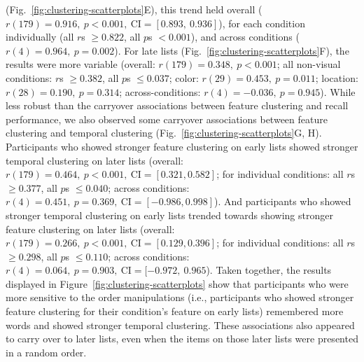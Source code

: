 \documentclass[11pt]{article}
\begin{document}
(Fig.~\ref{fig:clustering-scatterplots}E), this trend held overall ($r(179) =
0.916,~p < 0.001,~\mathrm{CI} = [0.893,~0.936]$), for each condition
individually (all $r$s $\geq 0.822$, all $p$s $< 0.001$), and across conditions
($r(4) = 0.964,~p = 0.002$). For late lists
(Fig.~\ref{fig:clustering-scatterplots}F), the results were more variable
(overall: $r(179) = 0.348,~p < 0.001$; all non-visual conditions: $r$s $\geq
0.382$, all $p$s $\leq 0.037$; color: $r(29) = 0.453,~p = 0.011$; location: $
r(28) = 0.190,~p = 0.314$; across-conditions: $r(4) = -0.036,~p = 0.945$).
While less robust than the carryover associations between feature clustering
and recall performance, we also observed some carryover associations between
feature clustering and temporal clustering
(Fig.~\ref{fig:clustering-scatterplots}G, H). Participants who showed stronger
feature clustering on early lists showed stronger temporal clustering on later
lists (overall: $r(179) = 0.464,~p < 0.001,~\mathrm{CI} = [0.321, 0.582]$; for
individual conditions: all $r$s $\geq 0.377$, all $p$s $\leq 0.040$; across
conditions: $ r(4) = 0.451,~p = 0.369,~\mathrm{CI} = [-0.986, 0.998]$). And
participants who showed stronger temporal clustering on early lists trended
towards showing stronger feature clustering on later lists (overall: $r(179) =
0.266,~p < 0.001,~\mathrm{CI} = [0.129, 0.396]$; for individual conditions: all
$r$s $\geq 0.298$, all $p$s $\leq 0.110$; across conditions: $r(4) = 0.064,~p =
0.903,~\mathrm{CI} = [-0.972,~0.965$). Taken together, the results displayed in
Figure~\ref{fig:clustering-scatterplots} show that participants who were more
sensitive to the order manipulations (i.e., participants who showed stronger
feature clustering for their condition's feature on early lists) remembered
more words and showed stronger temporal clustering. These associations also
appeared to carry over to later lists, even when the items on those later lists
were presented in a random order.
\end{document}
